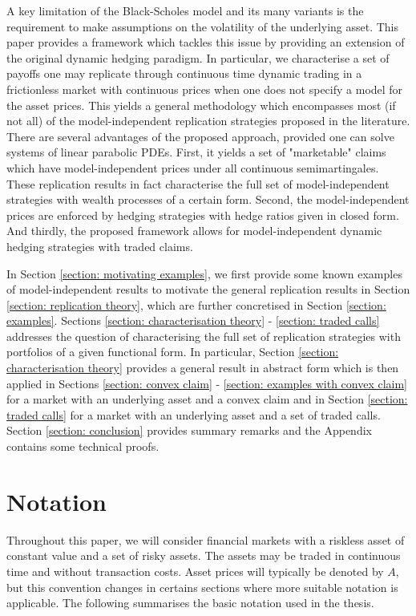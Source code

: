 \documentclass[11pt]{article}
\begin{document}
A key limitation of the Black-Scholes model and its many variants is the requirement to make assumptions on the volatility of the underlying asset. This paper provides a framework which tackles this issue by providing an extension of the original dynamic hedging paradigm. In particular, we characterise a set of payoffs one may replicate through continuous time dynamic trading in a frictionless market with continuous prices when one does not specify a model for the asset prices. This yields a general methodology which encompasses most (if not all) of the model-independent replication strategies proposed in the literature. There are several advantages of the proposed approach, provided one can solve systems of linear parabolic PDEs. First, it yields a set of "marketable" claims which have model-independent prices under all continuous semimartingales. These replication results in fact characterise the full set of model-independent strategies with wealth processes of a certain form. Second, the model-independent prices are enforced by hedging strategies with hedge ratios given in closed form. And thirdly, the proposed framework allows for model-independent dynamic hedging strategies with traded claims.

In Section \ref{section: motivating examples}, we first provide some known examples of model-independent results to motivate the general replication results in Section \ref{section: replication theory}, which are further concretised in Section \ref{section: examples}. Sections \ref{section: characterisation theory} - \ref{section: traded calls} addresses the question of characterising the full set of replication strategies with portfolios of a given functional form. In particular, Section \ref{section: characterisation theory} provides a general result in abstract form which is then applied in Sections \ref{section: convex claim} - \ref{section: examples with convex claim} for a market with an underlying asset and a convex claim and in Section \ref{section: traded calls} for a market with an underlying asset and a set of traded calls. Section \ref{section: conclusion} provides summary remarks and the Appendix contains some technical proofs.

\section*{Notation}
\label{section: notation}

Throughout this paper, we will consider financial markets with a riskless asset of constant value and a set of risky assets. The assets may be traded in continuous time and without transaction costs. Asset prices will typically be denoted by $A$, but this convention changes in certains sections where more suitable notation is applicable. The following summarises the basic notation used in the thesis.
\end{document}
